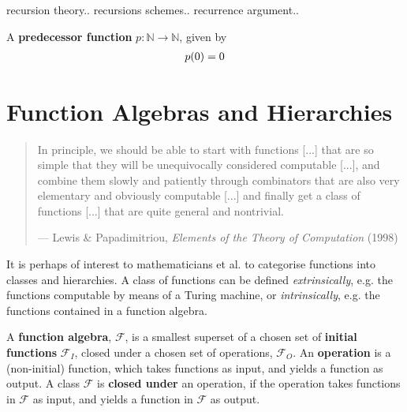 recursion theory..
recursions schemes..
recurrence argument..

A \textbf{predecessor function} $p : \mathbb{N} \rightarrow \mathbb{N}$, given
by\begin{align*}
%
p\p{0} = 0
%
\end{align*}

\section{Function Algebras and Hierarchies}

\begin{quotation}

\footnotesize\sffamily\itshape

\begin{flushright}

In principle, we should be able to start with functions [...] that are so
simple that they will be unequivocally considered computable [...], and combine
them slowly and patiently through combinators that are also very elementary and
obviously computable [...] and finally get a class of functions [...] that are
quite general and nontrivial.

\smallbreak

\upshape

--- Lewis \& Papadimitriou, \emph{Elements of the Theory of Computation} (1998)

\end{flushright}

\end{quotation}

It is perhaps of interest to mathematicians et al. to categorise functions into
classes and hierarchies. A class of functions can be defined
\emph{extrinsically}, e.g.  the functions computable by means of a Turing
machine, or \emph{intrinsically}, e.g. the functions contained in a function
algebra.

\begin{definition} A \textbf{function algebra}, $\mathcal{F}$, is a smallest
superset of a chosen set of \textbf{initial functions} $\mathcal{F}_I$, closed
under a chosen set of operations, $\mathcal{F}_O$. An \textbf{operation} is a
(non-initial) function, which takes functions as input, and yields a function
as output. A class $\mathcal{F}$ is \textbf{closed under} an operation, if the
operation takes functions in $\mathcal{F}$ as input, and yields a function in
$\mathcal{F}$ as output. \end{definition}

